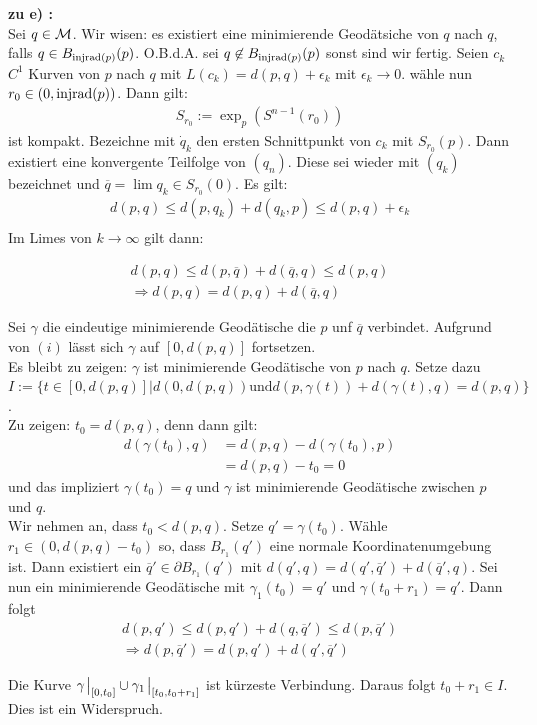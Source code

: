 \begin{bew}
\textbf{zu e) :}\\
Sei $q \in \mathcal{M}$. 
Wir wisen: es existiert eine minimierende Geodätsiche von $q$ nach $q$, 
falls $q \in B_{\operatorname{injrad} (p)} (p)$.
O.B.d.A.  sei $q \not\in B_{\operatorname{injrad} (p)} (p)$ sonst sind wir fertig.
Seien $c_k$ $C^{1}$ Kurven von $p$ nach $q$ mit 
$L(c_k) = d(p,q) + \epsilon_k$ mit $\epsilon_k \to 0$.
wähle nun $r_0 \in (0, \operatorname{injrad} (p))$.
Dann gilt:
\begin{align*}
    S_{r_0} := \exp_p (S^{n-1} (r_0))
\end{align*}
ist kompakt.
Bezeichne mit $\dot{q}_k$ den ersten Schnittpunkt von $c_k$ mit $S_{r_0} (p)$.
Dann existiert eine konvergente Teilfolge von $(q_n)$.
Diese sei wieder mit $(q_k)$ bezeichnet und $\overline{q} = \lim q_k \in S_{r_0} (0)$.
Es gilt:
\begin{align*}
    d(p,q) \leq d(p, q_k) + d(q_k , p) \leq d(p, q) + \epsilon_k\\
\end{align*}
Im Limes von $k \to \infty$ gilt dann:

\begin{align*}
    d(p,q) \leq d(p, \overline{q}) + d (\overline{q}, q) \leq d(p, q)\\
    \Rightarrow d(p, q) = d(p, q) + d(\overline{q} , q )
\end{align*}

Sei $\gamma$ die eindeutige minimierende Geodätische die $p$ unf $\overline{q}$
verbindet.
Aufgrund von $(i)$ lässt sich $\gamma$ auf $[0, d (p, q)]$ fortsetzen.\\
Es bleibt zu zeigen:
$\gamma$ ist minimierende Geodätische von $p$ nach $q$.
Setze dazu $I:= \{ t \in [0, d(p, q)] \vert d(0, d(p,q)) 
\text{und} d(p, \gamma (t) ) + d (\gamma (t) , q) = d(p, q) \} $.\\
Zu zeigen:
$t_0 = d(p,q)$, denn dann gilt:
\begin{align*}
    d(\gamma (t_0) , q) &= d(p,q) - d(\gamma (t_0), p) \\
    &= d(p,q) - t_0 = 0
\end{align*}
und das impliziert $\gamma (t_0) =q$ und $\gamma$ ist minimierende Geodätische
zwischen $p$ und $q$.\\
Wir nehmen an, dass $t_0 < d(p,q)$.
Setze $q' = \gamma (t_0)$.
Wähle $r_1 \in (0, d(p,q) -t_0)$ so, dass $B_{r_1} (q')$ eine normale 
Koordinatenumgebung ist.
Dann existiert ein $\overline{q}' \in \partial B_{r_1} (q')$ mit
$d(q', q) = d(q', \overline{q}') +  d(\overline{q}', q)$.
Sei nun ein minimierende Geodätische mit $\gamma_1 (t_0) = q'$ 
und $\gamma (t_0 + r_1) =q'$.
Dann folgt
\begin{align*}
    d(p, q') \leq d(p,q') + d(q, \overline{q}') \leq d(p,\overline{q}')\\
    \Rightarrow d(p, \overline{q}') = d(p, q' ) + d(q', \overline{q}') 
\end{align*}

Die Kurve $\gamma\eval_{[0, t_0]} \cup \gamma_1 \eval_{[t_0, t_0 + r_1]}$
ist kürzeste Verbindung.
Daraus folgt $t_0 + r_1 \in I$.
Dies ist ein Widerspruch.
\end{bew}


